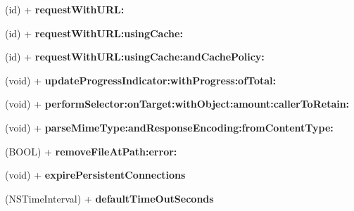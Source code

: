 \begin{DoxyCompactItemize}
\item 
\hypertarget{interface_a_s_i_h_t_t_p_request_a7765ce1ee8f72ed8c94cdf8496ad402f}{
(id) + {\bfseries request\-With\-U\-R\-L\-:}}
\label{interface_a_s_i_h_t_t_p_request_a7765ce1ee8f72ed8c94cdf8496ad402f}

\item 
\hypertarget{interface_a_s_i_h_t_t_p_request_a32b058d98f60a2534b343c1dbd3052b7}{
(id) + {\bfseries request\-With\-U\-R\-L\-:using\-Cache\-:}}
\label{interface_a_s_i_h_t_t_p_request_a32b058d98f60a2534b343c1dbd3052b7}

\item 
\hypertarget{interface_a_s_i_h_t_t_p_request_a3689b73937fe2d545f9ada537e9456f9}{
(id) + {\bfseries request\-With\-U\-R\-L\-:using\-Cache\-:and\-Cache\-Policy\-:}}
\label{interface_a_s_i_h_t_t_p_request_a3689b73937fe2d545f9ada537e9456f9}

\item 
\hypertarget{interface_a_s_i_h_t_t_p_request_a388e0a1539452c13a295935e0dedfbc0}{
(void) + {\bfseries update\-Progress\-Indicator\-:with\-Progress\-:of\-Total\-:}}
\label{interface_a_s_i_h_t_t_p_request_a388e0a1539452c13a295935e0dedfbc0}

\item 
\hypertarget{interface_a_s_i_h_t_t_p_request_af21104015bdf96b66eba906e20a45c02}{
(void) + {\bfseries perform\-Selector\-:on\-Target\-:with\-Object\-:amount\-:caller\-To\-Retain\-:}}
\label{interface_a_s_i_h_t_t_p_request_af21104015bdf96b66eba906e20a45c02}

\item 
\hypertarget{interface_a_s_i_h_t_t_p_request_a2acd5b3016fd0059c6561e7790810276}{
(void) + {\bfseries parse\-Mime\-Type\-:and\-Response\-Encoding\-:from\-Content\-Type\-:}}
\label{interface_a_s_i_h_t_t_p_request_a2acd5b3016fd0059c6561e7790810276}

\item 
\hypertarget{interface_a_s_i_h_t_t_p_request_a7ad8b2ff99ff2e0ef0130eddcd99d57a}{
(\-B\-O\-O\-L) + {\bfseries remove\-File\-At\-Path\-:error\-:}}
\label{interface_a_s_i_h_t_t_p_request_a7ad8b2ff99ff2e0ef0130eddcd99d57a}

\item 
\hypertarget{interface_a_s_i_h_t_t_p_request_ac9af022d65aa15048ef764a25eda64be}{
(void) + {\bfseries expire\-Persistent\-Connections}}
\label{interface_a_s_i_h_t_t_p_request_ac9af022d65aa15048ef764a25eda64be}

\item 
\hypertarget{interface_a_s_i_h_t_t_p_request_a366919ebbfefeb30a42e057514a9a357}{
(\-N\-S\-Time\-Interval) + {\bfseries default\-Time\-Out\-Seconds}}
\label{interface_a_s_i_h_t_t_p_request_a366919ebbfefeb30a42e057514a9a357}


\end{DoxyCompactItemize}
